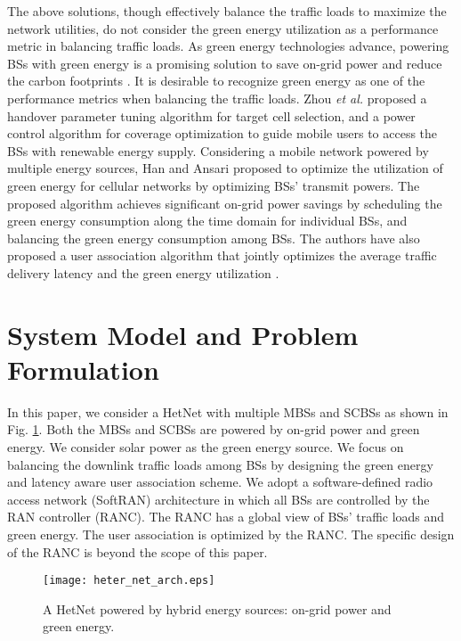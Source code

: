 \documentclass[journal]{IEEEtran}
\theoremstyle{definition}
\begin{document}
The above solutions, though effectively balance the traffic loads to maximize the network utilities, do not consider the green energy utilization as a performance metric in balancing traffic loads. As green energy technologies advance, powering BSs with green energy is a promising solution to save on-grid power and reduce the carbon footprints \cite{Han:2014:PMN}. It is desirable to recognize green energy as one of the performance metrics when balancing the traffic loads. Zhou \emph{et al.} \cite{Zhou:2010:ESA:} proposed a handover parameter tuning algorithm for target cell selection, and a power control algorithm for coverage optimization to guide mobile users to access the BSs with renewable energy supply. Considering a mobile network powered by multiple energy sources, Han and Ansari \cite{Han:2013:OOG} proposed to optimize the utilization of green energy for cellular networks by optimizing BSs' transmit powers. The proposed algorithm achieves significant on-grid power savings by scheduling the green energy consumption along the time domain for individual BSs, and balancing the green energy consumption among BSs. The authors have also proposed a user association algorithm that jointly optimizes the average traffic delivery latency and the green energy utilization \cite{Han:2013:GALA}.


\section{System Model and Problem Formulation}
\label{sec:sys_model}
In this paper, we consider a HetNet with multiple MBSs and SCBSs as shown in Fig. \ref{fig:heter_net_arch}. Both the MBSs and SCBSs are powered by on-grid power and green energy. We consider solar power as the green energy source. We focus on balancing the downlink traffic loads among BSs by designing the green energy and latency aware user association scheme. We adopt a software-defined radio access network (SoftRAN) architecture in which all BSs are controlled by the RAN controller (RANC). The RANC has a global view of BSs' traffic loads and green energy. The user association is optimized by the RANC. The specific design of the RANC is beyond the scope of this paper.
\begin{figure}[htb]
\centering
\texttt{[image: heter\_net\_arch.eps]}
\caption{A HetNet powered by hybrid energy sources: on-grid power and green energy.}
\label{fig:heter_net_arch}
\vspace{-20pt}
\end{figure}
\end{document}
